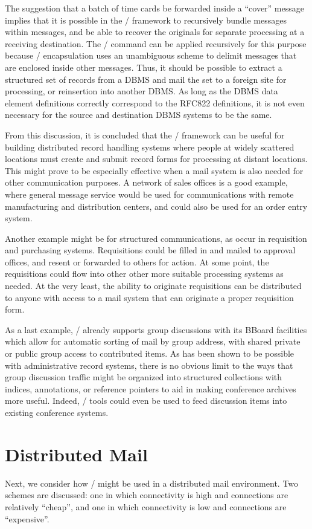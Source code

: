 The suggestion that a batch of time cards be forwarded inside a ``cover''
message implies that it is possible in the \MH/ framework to recursively
bundle messages within messages, and be able to recover the originals for
separate processing at a receiving destination.
The \MH/  command can be applied recursively for this purpose
because \MH/ encapsulation uses an unambiguous scheme to delimit messages
that are enclosed inside other messages.
Thus,
it should be possible to extract a structured set of records from a DBMS
and mail the set to a foreign site for processing, or reinsertion into
another DBMS.
As long as the DBMS data element definitions
correctly correspond to the RFC822 definitions,
it is not even necessary
for the source and destination DBMS systems to be the same.

From this discussion,
it is concluded that the \MH/ framework can be useful
for building distributed record handling systems where people at widely
scattered locations must create and submit record forms for processing
at distant locations.
This might prove to be especially effective when
a mail system is also needed for other communication purposes.
A network of sales offices is a good example,
where general message service would be used for communications
with remote manufacturing and distribution centers,
and could also be used for an order entry system.

Another example might be for structured communications, as occur in
requisition and purchasing systems.
Requisitions could be filled in and mailed to approval offices,
and resent or forwarded to others for action.
At some point,
the requisitions could flow into other other more suitable
processing systems as needed.
At the very least, the ability to originate
requisitions can be distributed to anyone with access to a mail system
that can originate a proper requisition form.

As a last example,
\MH/ already supports group discussions with its BBoard facilities
which allow for automatic sorting of mail by group address,
with shared private or public group access to contributed items.
As has been shown to be possible with administrative record systems,
there is no obvious limit to the ways that group discussion traffic
might be organized into structured collections with indices,
annotations, or reference pointers
to aid in making conference archives more useful.
Indeed, \MH/ tools could even be used to feed discussion items into
existing conference systems.

\section{Distributed Mail}			%
Next, we consider how \MH/ might be used in a distributed mail environment.
Two schemes are discussed:
one in which connectivity is high and connections are relatively ``cheap'',
and one in which connectivity is low and connections are ``expensive''.

